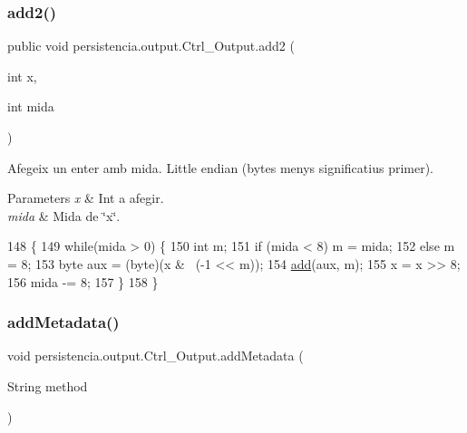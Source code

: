 \subsubsection{\texorpdfstring{add2()}{add2()}}
{\footnotesize\ttfamily public void persistencia.\+output.\+Ctrl\+\_\+\+Output.\+add2 (\begin{DoxyParamCaption}\item[{int}]{x,  }\item[{int}]{mida }\end{DoxyParamCaption})\hspace{0.3cm}{\ttfamily [inline]}}



Afegeix un enter amb mida. Little endian (bytes menys significatius primer). 


\begin{DoxyParams}{Parameters}
{\em x} & Int a afegir. \\
\hline
{\em mida} & Mida de \char`\"{}x\char`\"{}. \\
\hline
\end{DoxyParams}

\begin{DoxyCode}
148     \{
149         \textcolor{keywordflow}{while}(mida > 0) \{
150             \textcolor{keywordtype}{int} m;
151             \textcolor{keywordflow}{if} (mida < 8) m = mida;
152             \textcolor{keywordflow}{else} m = 8;
153             byte aux = (byte)(x & ~(-1 << m));
154             \hyperlink{classpersistencia_1_1output_1_1Ctrl__Output_a8c5aa5a6acb5259faeb1c05c71ddd21c}{add}(aux, m);
155             x = x >> 8;
156             mida -= 8;
157         \}
158     \}
\end{DoxyCode}
\mbox{\label{classpersistencia_1_1output_1_1Ctrl__Output_ae6d6857910a023982900ddc857b891f0}} 
\subsubsection{\texorpdfstring{add\+Metadata()}{addMetadata()}}
{\footnotesize\ttfamily void persistencia.\+output.\+Ctrl\+\_\+\+Output.\+add\+Metadata (\begin{DoxyParamCaption}\item[{String}]{method }\end{DoxyParamCaption})\hspace{0.3cm}{\ttfamily [inline]}}



